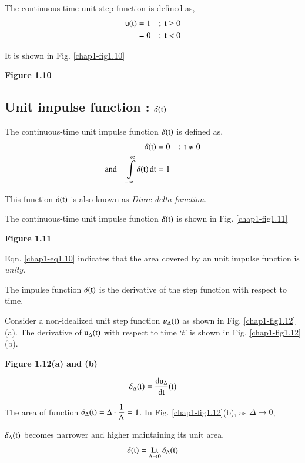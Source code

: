 The continuous-time unit step function is defined as,
\begin{align*}
\textrm{u}(\textrm{t}) &= 1\quad ;~ \textrm{t}\geq 0\\
     &= 0\quad ;~ \textrm{t}<0
\end{align*}

It is shown in Fig. \ref{chap1-fig1.10}
\begin{center}
{\bf Figure 1.10}
\end{center}

\subsection{Unit impulse function : $\delta(\textrm{t})$}\label{chap1-sec1.3.5}

The continuous-time unit impulse function $\delta(\textrm{t})$ is defined as,
\begin{align}
\delta(\textrm{t}) &= 0\quad ;~ \textrm{t}\neq 0\notag\\
\text{and}\quad \int\limits^{\infty}_{-\infty}\delta(\textrm{t})\operatorname{dt} &=1\label{chap1-eq1.10}
\end{align}

This function $\delta(\textrm{t})$ is also known as {\em Dirac delta function}.

The continuous-time unit impulse function $\delta(\textrm{t})$ is shown in Fig. \ref{chap1-fig1.11}
\begin{center}
{\bf Figure 1.11}
\end{center}

Eqn. \eqref{chap1-eq1.10} indicates that the area covered by an unit impulse function is {\em unity}.

The impulse function $\delta(\textrm{t})$ is the derivative of the step function with respect to time.

Consider a non-idealized unit step function $u_{\Delta}(\textrm{t})$ as shown in Fig. \ref{chap1-fig1.12}(a). The derivative of $\textrm{u}_{\Delta}(\textrm{t})$ with respect to time `$t$' is shown in Fig. \ref{chap1-fig1.12}(b).
\begin{center}
{\bf Figure 1.12(a) and (b)}
\end{center}
\begin{equation}
\delta_{\Delta}(\textrm{t})=\dfrac{\operatorname{du}_{\Delta}}{\operatorname{dt}}(\textrm{t})\label{chap1-eq1.11}
\end{equation}

The area of function $\delta_{\Delta}(\textrm{t})=\Delta \cdot \dfrac{1}{\Delta}=1$. In Fig. \ref{chap1-fig1.12}(b), as $\Delta\to 0$,

$\delta_{\Delta}(\textrm{t})$ becomes narrower and higher maintaining its unit area.
\begin{equation}
\delta(\textrm{t})=\operatorname*{Lt}\limits_{\Delta \to 0}\delta_{\Delta}(\textrm{t})\label{chap1-eq1.12}
\end{equation}

